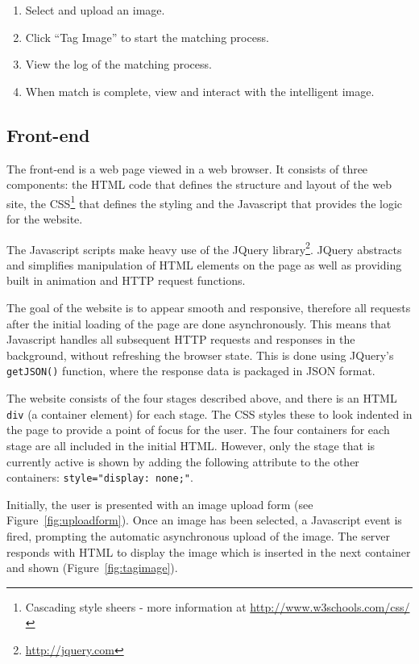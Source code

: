 \documentclass[11pt, onecolumn, a4paper, final]{report} %
\begin{document}
\begin{enumerate}
\item Select and upload an image.
\item Click ``Tag Image'' to start the matching process.
\item View the log of the matching process.
\item When match is complete, view and interact with the intelligent image.
\end{enumerate}

\subsection{Front-end}
\label{subsec:front}
The front-end is a web page viewed in a web browser. It consists of three components: the HTML code that defines the structure and layout of the web site, the CSS\footnote{Cascading style sheers - more information at \url{http://www.w3schools.com/css/}} that defines the styling and the Javascript that provides the logic for the website.

The Javascript scripts make heavy use of the JQuery library\footnote{\url{http://jquery.com}}. JQuery abstracts and simplifies manipulation of HTML elements on the page as well as providing built in animation and HTTP request functions. 

The goal of the website is to appear smooth and responsive, therefore all requests after the initial loading of the page are done asynchronously. This means that Javascript handles all subsequent HTTP requests and responses in the background, without refreshing the browser state. This is done using JQuery's \lstinline!getJSON()! function, where the response data is packaged in JSON format.

\lstset{language=HTML}
The website consists of the four stages described above, and there is an HTML  \lstinline!div! (a container element) for each stage. The CSS styles these to look indented in the page to provide a point of focus for the user. The four containers for each stage are all included in the initial HTML. However, only the stage that is currently active is shown by adding the following attribute to the other containers: \lstinline!style="display: none;"!. 

Initially, the user is presented with an image upload form (see Figure~\ref{fig:uploadform}). Once an image has been selected, a Javascript event is fired, prompting the automatic asynchronous upload of the image. The server responds with HTML to display the image which is inserted in the next container and shown (Figure~\ref{fig:tagimage}).
\end{document}
